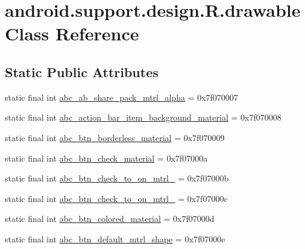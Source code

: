 \hypertarget{classandroid_1_1support_1_1design_1_1_r_1_1drawable}{}\section{android.\+support.\+design.\+R.\+drawable Class Reference}
\label{classandroid_1_1support_1_1design_1_1_r_1_1drawable}
\subsection*{Static Public Attributes}
\begin{DoxyCompactItemize}
\item 
static final int \mbox{\hyperlink{classandroid_1_1support_1_1design_1_1_r_1_1drawable_a625cabc6eb240aa7880b51672cf7a8fe}{abc\+\_\+ab\+\_\+share\+\_\+pack\+\_\+mtrl\+\_\+alpha}} = 0x7f070007
\item 
static final int \mbox{\hyperlink{classandroid_1_1support_1_1design_1_1_r_1_1drawable_a68a1b154dd7f464140cfa7da69c3f930}{abc\+\_\+action\+\_\+bar\+\_\+item\+\_\+background\+\_\+material}} = 0x7f070008
\item 
static final int \mbox{\hyperlink{classandroid_1_1support_1_1design_1_1_r_1_1drawable_a9aec4c6386a209299b4feedfeb3cfc32}{abc\+\_\+btn\+\_\+borderless\+\_\+material}} = 0x7f070009
\item 
static final int \mbox{\hyperlink{classandroid_1_1support_1_1design_1_1_r_1_1drawable_a765ed07aab918db5eb82ac420614fb81}{abc\+\_\+btn\+\_\+check\+\_\+material}} = 0x7f07000a
\item 
static final int \mbox{\hyperlink{classandroid_1_1support_1_1design_1_1_r_1_1drawable_a14f5a95b1142d505e2ab42008b9be478}{abc\+\_\+btn\+\_\+check\+\_\+to\+\_\+on\+\_\+mtrl\+\_}} = 0x7f07000b
\item 
static final int \mbox{\hyperlink{classandroid_1_1support_1_1design_1_1_r_1_1drawable_a875816c18771a913557708c7f31df30d}{abc\+\_\+btn\+\_\+check\+\_\+to\+\_\+on\+\_\+mtrl\+\_}} = 0x7f07000c
\item 
static final int \mbox{\hyperlink{classandroid_1_1support_1_1design_1_1_r_1_1drawable_ac6ab80376e6c2c49f68b33f9b4fa217f}{abc\+\_\+btn\+\_\+colored\+\_\+material}} = 0x7f07000d
\item 
static final int \mbox{\hyperlink{classandroid_1_1support_1_1design_1_1_r_1_1drawable_a221d8c015be6efecdbce8deef1aff0d3}{abc\+\_\+btn\+\_\+default\+\_\+mtrl\+\_\+shape}} = 0x7f07000e
\item 

\end{DoxyCompactItemize}
